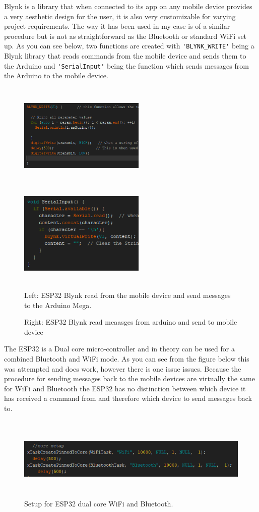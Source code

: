\documentclass[8pt, a4paper]{article}
\begin{document}
Blynk is a library that when connected to its app on any mobile device provides a very aesthetic design for the user, it is also very customizable for varying project requirements.
The way it has been used in my case is of a similar procedure but is not as straightforward as the Bluetooth or standard WiFi set up. As you can see below, two functions are created with \verb|'BLYNK_WRITE'| being a Blynk library that reads commands from the mobile device and sends them to the Arduino and \verb|'SerialInput'| being the function which sends messages from the Arduino to the mobile device.

\begin{figure}[H]
	\centering
	\includegraphics[height=5.0cm, width=6.0cm]{blynk1}
	\includegraphics[height=5.0cm, width=6.0cm]{blynk2}
	\caption{Left: ESP32 Blynk read from the mobile device and send messages to the Arduino Mega.}
	\caption{Right: ESP32 Blynk read meaasges from arduino and send to mobile device}
\end{figure}

The ESP32 is a Dual core micro-controller and in theory can be used for a combined Bluetooth and WiFi mode. As you can see from the figure below this was attempted and does work, however there is one issue issues. Because the procedure for sending messages back to the mobile devices are virtually the same for WiFi and Bluetooth the ESP32 has no distinction between which device it has received a command from and therefore which device to send messages back to.

\begin{figure}[H]
	\centering
	\includegraphics[height=4.0cm, width=15.0cm]{multicore}
	\caption{Setup for ESP32 dual core WiFi and Bluetooth.}
\end{figure}
\end{document}
